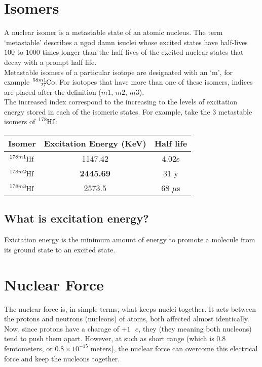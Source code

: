 \documentclass{article}
\begin{document}
\begin{multicols*}{2}
    \section{Isomers}
    A nuclear isomer is a metastable state of an atomic nucleus. The term
    `metastable' describes a ngod damn isuclei whose excited states have half-lives $100$
    to $1000$ times longer than the half-lives of the excited nuclear states
    that decay with a prompt half life.\\

    Metastable isomers of a particular isotope are designated with an `m',
    for example $\ce{^{58m1}_{27}Co}$. For isotopes that have more than one
    of these isomers, indices are placed after the definition ($m1$, $m2$,
    $m3$).\\

    The increased index correspond to the increasing to the levels of excitation
    energy stored in each of the isomeric states. For example, take the $3$
    metastable isomers of $\ce{^{178}Hf}$:\\

    \begin{tabular}{|c|c|c|}
      \hline
      Isomer & Excitation Energy (KeV) & Half life \\
      \hline
      $\ce{^{178m1}Hf}$ & 1147.42 & 4.02s \\
      $\ce{^{178m2}Hf}$ & \textbf{2445.69} & 31 y \\
      $\ce{^{178m3}Hf}$ & 2573.5 & 68 $\mu$s \\
      \hline
    \end{tabular}

    \subsection{What is excitation energy?}
    Exictation energy is the minimum amount of energy to promote a molecule
    from its ground state to an excited state.


    \section{Nuclear Force}
    The nuclear force is, in simple terms, what keeps nuclei together. It
    acts between the protons and neutrons (nucleons) of atoms, both affected
    almost identically.\\

    Now, since protons have a charage of $+1\text{ }e$, they (they meaning
    both nucleons) tend to push them apart. However, at such as short range
    (which is $0.8$ femtometers, or $0.8 \times 10^{-15}$ meters), the nuclear
    force can overcome this electrical force and keep the nucleons together.


\end{multicols*}
\end{document}
